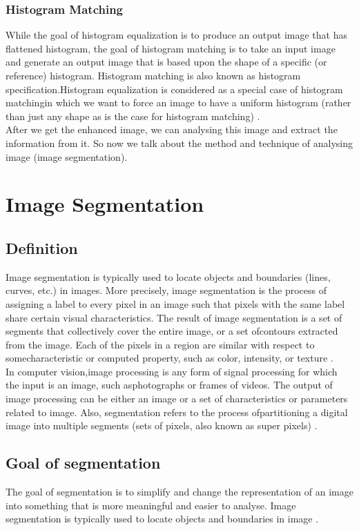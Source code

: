 \subsubsection{Histogram Matching}
While the goal of histogram equalization is to produce an output image that has flattened histogram, the goal
of histogram matching is to take an input image and generate an output image that is based upon the shape of a
specific (or reference) histogram. Histogram matching is also known as histogram specification.Histogram equalization
is considered as a special case of histogram matchingin which we want to force an image to have a uniform histogram
(rather than just any shape as is the case for histogram matching) \cite{1.15}.\\
After we get the enhanced image, we can analysing this image and extract the information from it. So now we talk
about the method and technique of analysing image (image segmentation).

\section{Image Segmentation}
\subsection{Definition}
Image segmentation is typically used to locate objects and boundaries (lines, curves, etc.) in images.
More precisely, image segmentation is the process of assigning a label to every pixel in an image such
that pixels with the same label share certain visual characteristics. The result of image segmentation is
a set of segments that collectively cover the entire image, or a set ofcontours extracted from the image.
Each of the pixels in a region are similar with respect to somecharacteristic or computed property,
such as color, intensity, or texture \cite{1.16}.\\
In computer vision,image processing is any form of signal processing for which the input is an image,
such asphotographs or frames of videos. The output of image processing can be either an image or a set
of characteristics or parameters related to image. Also, segmentation refers to the process ofpartitioning
a digital image into multiple segments (sets of pixels, also known as super pixels) \cite{1.16}.
\subsection{Goal of segmentation}
The goal of segmentation is to simplify and change the representation of an image into something that is
more meaningful and easier to analyse. Image segmentation is typically used to locate objects and boundaries in image \cite{1.17}.
